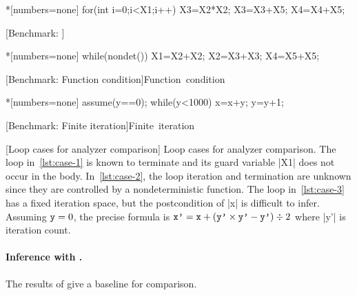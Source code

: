 \begin{center}
\captionsetup{type=figure}
\begin{minipage}{\textwidth}
\begin{minipage}[t]{.33\textwidth}
\begin{implisting}*[numbers=none]
for(int i=0;i<X1;i++)
{ X3=X2*X2;
  X3=X3+X5;
  X4=X4+X5; }
\end{implisting}
[Benchmark: \explain]{\mbox{\explain}}
\label{lst:case-1}
\end{minipage}\hfill%
\begin{minipage}[t]{.33\textwidth}
\begin{implisting}*[numbers=none]
while(nondet())
{ X1=X2+X2;
  X2=X3+X3;
  X4=X5+X5; }
\end{implisting}
[Benchmark: Function condition]{\mbox{Function condition}}
\label{lst:case-2}
\end{minipage}\hfill%
\begin{minipage}[t]{.3\textwidth}
\begin{implisting}*[numbers=none]
assume(y==0);
while(y<1000)
{ x=x+y;
  y=y+1; }
\end{implisting}
[Benchmark: Finite iteration]{\mbox{Finite iteration}}
\label{lst:case-3}
\end{minipage}
\end{minipage}
[Loop cases for analyzer comparison]{
Loop cases for analyzer comparison.
The loop in~\ref{lst:case-1} is known to terminate and its guard variable \pr|X1| does not occur in the body.
In~\ref{lst:case-2}, the loop iteration and termination are unknown since they are controlled by a nondeterministic function.
The loop in~\ref{lst:case-3} has a fixed iteration space, but the postcondition of \pr|x| is difficult to infer.
Assuming \(\prm{y}=0\), the precise formula is \(\prm{x'} = \prm{x} + (\prm{y'} \times \prm{y'} - \prm{y'}) \div 2\) where \pr|y'| is iteration count.}
\label{fig:loops}
\end{center}

\paragraph{Inference with \impl.}
The results of \ndx{\impl} give a baseline for comparison.

